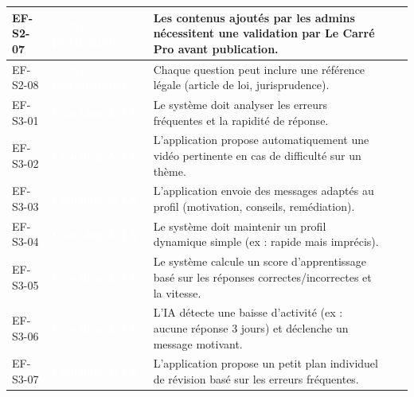 \begin{longtable}{|P{1.75cm}|P{2.65cm}|P{7.45cm}|P{1.80cm}|P{1.55cm}|}
EF-S2-07 & \textcolor{white}{\textbf{Contenus pédagogiques}} & Les contenus ajoutés par les admins nécessitent une validation par Le Carré Pro avant publication. &  &  \\ \hline
EF-S2-08 & \textcolor{white}{\textbf{Contenus pédagogiques}} & Chaque question peut inclure une référence légale (article de loi, jurisprudence). &  &  \\ \hline
EF-S3-01 & \textcolor{white}{\textbf{Coaching \& IA}} & Le système doit analyser les erreurs fréquentes et la rapidité de réponse. &  &  \\ \hline
EF-S3-02 & \textcolor{white}{\textbf{Coaching \& IA}} & L’application propose automatiquement une vidéo pertinente en cas de difficulté sur un thème. &  &  \\ \hline
EF-S3-03 & \textcolor{white}{\textbf{Coaching \& IA}} & L’application envoie des messages adaptés au profil (motivation, conseils, remédiation). &  &  \\ \hline
EF-S3-04 & \textcolor{white}{\textbf{Coaching \& IA}} & Le système doit maintenir un profil dynamique simple (ex : rapide mais imprécis). &  &  \\ \hline
EF-S3-05 & \textcolor{white}{\textbf{Coaching \& IA}} & Le système calcule un score d’apprentissage basé sur les réponses correctes/incorrectes et la vitesse. &  &  \\ \hline
EF-S3-06 & \textcolor{white}{\textbf{Coaching \& IA}} & L’IA détecte une baisse d’activité (ex : aucune réponse 3 jours) et déclenche un message motivant. &  &  \\ \hline
EF-S3-07 & \textcolor{white}{\textbf{Coaching \& IA}} & L’application propose un petit plan individuel de révision basé sur les erreurs fréquentes. &  &  \\ \hline

\end{longtable}
